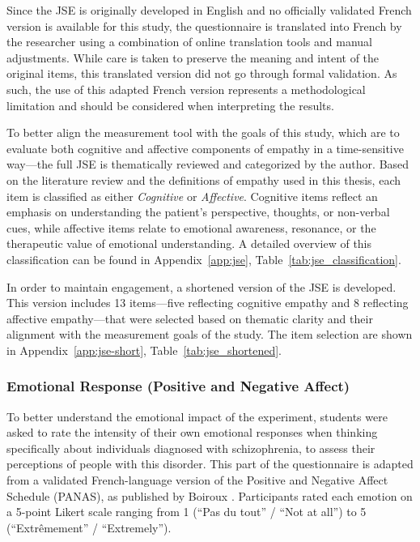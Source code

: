 \vspace{1em}

Since the JSE is originally developed in English and no officially validated French version is available for this study, the questionnaire is translated into French by the researcher using a combination of online translation tools and manual adjustments. While care is taken to preserve the meaning and intent of the original items, this translated version did not go through formal validation. As such, the use of this adapted French version represents a methodological limitation and should be considered when interpreting the results.

\vspace{1em}

To better align the measurement tool with the goals of this study, which are to evaluate both cognitive and affective components of empathy in a time-sensitive way—the full JSE is thematically reviewed and categorized by the author. Based on the literature review and the definitions of empathy used in this thesis, each item is classified as either \textit{Cognitive} or \textit{Affective}. Cognitive items reflect an emphasis on understanding the patient’s perspective, thoughts, or non-verbal cues, while affective items relate to emotional awareness, resonance, or the therapeutic value of emotional understanding. A detailed overview of this classification can be found in Appendix~\ref{app:jse}, Table~\ref{tab:jse_classification}.

In order to maintain engagement, a shortened version of the JSE is developed. This version includes 13 items—five reflecting cognitive empathy and 8 reflecting affective empathy—that were selected based on thematic clarity and their alignment with the measurement goals of the study. The item selection are shown in Appendix~\ref{app:jse-short}, Table~\ref{tab:jse_shortened}. %

\subsubsection{Emotional Response (Positive and Negative Affect)}

To better understand the emotional impact of the experiment, students were asked to rate the intensity of their own emotional responses when thinking specifically about individuals diagnosed with schizophrenia, to assess their perceptions of people with this disorder. This part of the questionnaire is adapted from a validated French-language version of the Positive and Negative Affect Schedule (PANAS), as published by Boiroux \cite{Boiroux2024}. Participants rated each emotion on a 5-point Likert scale ranging from 1 (“Pas du tout” / “Not at all”) to 5 (“Extrêmement” / “Extremely”).

